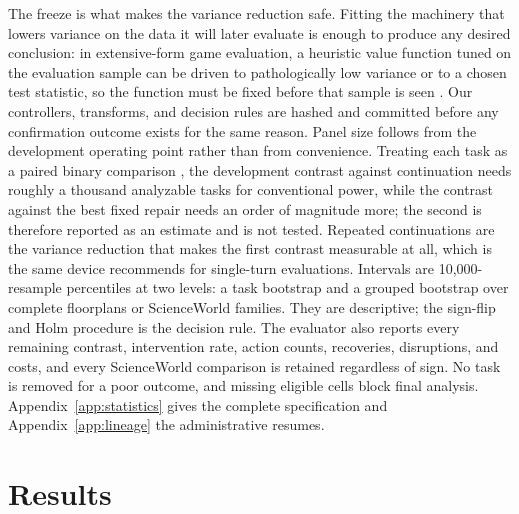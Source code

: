 The freeze is what makes the variance reduction safe. Fitting the machinery that lowers variance on the data it will later evaluate is enough to produce any desired conclusion: in extensive-form game evaluation, a heuristic value function tuned on the evaluation sample can be driven to pathologically low variance or to a chosen test statistic, so the function must be fixed before that sample is seen \citep{kim2026aivat}. Our controllers, transforms, and decision rules are hashed and committed before any confirmation outcome exists for the same reason. Panel size follows from the development operating point rather than from convenience. Treating each task as a paired binary comparison \citep{miller2024errorbars}, the development contrast against continuation needs roughly a thousand analyzable tasks for conventional power, while the contrast against the best fixed repair needs an order of magnitude more; the second is therefore reported as an estimate and is not tested. Repeated continuations are the variance reduction that makes the first contrast measurable at all, which is the same device \citet{miller2024errorbars} recommends for single-turn evaluations. Intervals are 10,000-resample percentiles at two levels: a task bootstrap and a grouped bootstrap over complete floorplans or ScienceWorld families. They are descriptive; the sign-flip and Holm procedure is the decision rule. The evaluator also reports every remaining contrast, intervention rate, action counts, recoveries, disruptions, and costs, and every ScienceWorld comparison is retained regardless of sign. No task is removed for a poor outcome, and missing eligible cells block final analysis. Appendix~\ref{app:statistics} gives the complete specification and Appendix~\ref{app:lineage} the administrative resumes.

\section{Results}
\label{sec:results}

